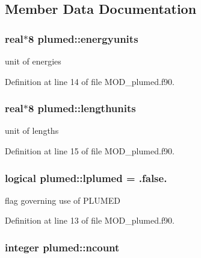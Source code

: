 \subsection{Member Data Documentation}
\hypertarget{classplumed_a65158efb6a21a8b9c6de94dbd23376ab}{
\subsubsection[{energyunits}]{\setlength{\rightskip}{0pt plus 5cm}real$\ast$8 plumed\-::energyunits}}\label{classplumed_a65158efb6a21a8b9c6de94dbd23376ab}


unit of energies 



Definition at line 14 of file M\-O\-D\-\_\-plumed.\-f90.

\hypertarget{classplumed_a6373fbd65916ce8d4398fea166a10674}{
\subsubsection[{lengthunits}]{\setlength{\rightskip}{0pt plus 5cm}real$\ast$8 plumed\-::lengthunits}}\label{classplumed_a6373fbd65916ce8d4398fea166a10674}


unit of lengths 



Definition at line 15 of file M\-O\-D\-\_\-plumed.\-f90.

\hypertarget{classplumed_ac1262f9bab62ea649ff431d0623adcdc}{
\subsubsection[{lplumed}]{\setlength{\rightskip}{0pt plus 5cm}logical plumed\-::lplumed = .false.}}\label{classplumed_ac1262f9bab62ea649ff431d0623adcdc}


flag governing use of P\-L\-U\-M\-E\-D 



Definition at line 13 of file M\-O\-D\-\_\-plumed.\-f90.

\hypertarget{classplumed_a48a97baaf97158b7283ced58dc4642b1}{
\subsubsection[{ncount}]{\setlength{\rightskip}{0pt plus 5cm}integer plumed\-::ncount}}\label{classplumed_a48a97baaf97158b7283ced58dc4642b1}


